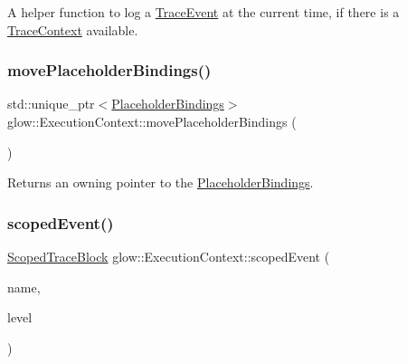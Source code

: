 A helper function to log a \hyperlink{structglow_1_1_trace_event}{Trace\+Event} at the current time, if there is a \hyperlink{classglow_1_1_trace_context}{Trace\+Context} available. \mbox{\label{classglow_1_1_execution_context_ab16953545c9c9c181083425f8e319a17}} 
\subsubsection{\texorpdfstring{move\+Placeholder\+Bindings()}{movePlaceholderBindings()}}
{\footnotesize\ttfamily std\+::unique\+\_\+ptr$<$\hyperlink{classglow_1_1_placeholder_bindings}{Placeholder\+Bindings}$>$ glow\+::\+Execution\+Context\+::move\+Placeholder\+Bindings (\begin{DoxyParamCaption}{ }\end{DoxyParamCaption})\hspace{0.3cm}{\ttfamily [inline]}}

\begin{DoxyReturn}{Returns}
an owning pointer to the \hyperlink{classglow_1_1_placeholder_bindings}{Placeholder\+Bindings}. 
\end{DoxyReturn}
\mbox{\label{classglow_1_1_execution_context_a81cef00fa3055426a4949c2f08f628a5}} 
\subsubsection{\texorpdfstring{scoped\+Event()}{scopedEvent()}}
{\footnotesize\ttfamily \hyperlink{classglow_1_1_scoped_trace_block}{Scoped\+Trace\+Block} glow\+::\+Execution\+Context\+::scoped\+Event (\begin{DoxyParamCaption}\item[{llvm\+::\+String\+Ref}]{name,  }\item[{\hyperlink{structglow_1_1_trace_event_a10132a384d74408a112510cbe1b7d978}{Trace\+Level}}]{level }\end{DoxyParamCaption})\hspace{0.3cm}{\ttfamily [inline]}}

